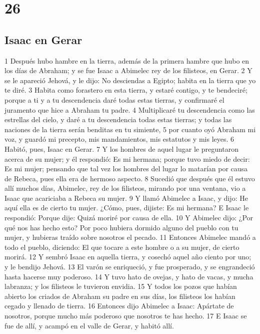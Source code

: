 \chapter{26}

\section*{Isaac en Gerar}

1 Después hubo hambre en la tierra, además de la primera hambre que hubo en los días de Abraham; y se fue Isaac a Abimelec rey de los filisteos, en Gerar.
2 Y se le apareció Jehová, y le dijo: No desciendas a Egipto; habita en la tierra que yo te diré.
3 Habita como forastero en esta tierra, y estaré contigo, y te bendeciré; porque a ti y a tu descendencia daré todas estas tierras, y confirmaré el juramento que hice a Abraham tu padre.
4 Multiplicaré tu descendencia como las estrellas del cielo, y daré a tu descendencia todas estas tierras; y todas las naciones de la tierra serán benditas en tu simiente,
5 por cuanto oyó Abraham mi voz, y guardó mi precepto, mis mandamientos, mis estatutos y mis leyes.
6 Habitó, pues, Isaac en Gerar.
7 Y los hombres de aquel lugar le preguntaron acerca de su mujer; y él respondió: Es mi hermana; porque tuvo miedo de decir: Es mi mujer; pensando que tal vez los hombres del lugar lo matarían por causa de Rebeca, pues ella era de hermoso aspecto.
8 Sucedió que después que él estuvo allí muchos días, Abimelec, rey de los filisteos, mirando por una ventana, vio a Isaac que acariciaba a Rebeca su mujer.
9 Y llamó Abimelec a Isaac, y dijo: He aquí ella es de cierto tu mujer. ¿Cómo, pues, dijiste: Es mi hermana? E Isaac le respondió: Porque dije: Quizá moriré por causa de ella.
10 Y Abimelec dijo: ¿Por qué nos has hecho esto? Por poco hubiera dormido alguno del pueblo con tu mujer, y hubieras traído sobre nosotros el pecado.
11 Entonces Abimelec mandó a todo el pueblo, diciendo: El que tocare a este hombre o a su mujer, de cierto morirá.
12 Y sembró Isaac en aquella tierra, y cosechó aquel año ciento por uno; y le bendijo Jehová.
13 El varón se enriqueció, y fue prosperado, y se engrandeció hasta hacerse muy poderoso.
14 Y tuvo hato de ovejas, y hato de vacas, y mucha labranza; y los filisteos le tuvieron envidia.
15 Y todos los pozos que habían abierto los criados de Abraham su padre en sus días, los filisteos los habían cegado y llenado de tierra.
16 Entonces dijo Abimelec a Isaac: Apártate de nosotros, porque mucho más poderoso que nosotros te has hecho.
17 E Isaac se fue de allí, y acampó en el valle de Gerar, y habitó allí.
